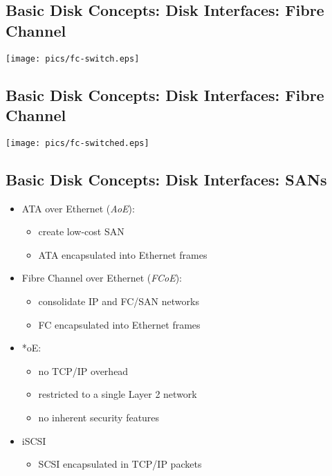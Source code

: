 \documentclass[xga]{xdvislides}
\begin{document}
\subsection{Basic Disk Concepts: Disk Interfaces: Fibre Channel}
\vfill
	\begin{center}
		\texttt{[image: pics/fc-switch.eps]} \\
	\end{center}
\vfill

\subsection{Basic Disk Concepts: Disk Interfaces: Fibre Channel}
\vfill
	\begin{center}
		\texttt{[image: pics/fc-switched.eps]} \\
	\end{center}
\vfill

\subsection{Basic Disk Concepts: Disk Interfaces: SANs}
\begin{itemize}
	\item ATA over Ethernet ({\em AoE}):
		\begin{itemize}
			\item create low-cost SAN
			\item ATA encapsulated into Ethernet frames
		\end{itemize}
	\item Fibre Channel over Ethernet ({\em FCoE}):
		\begin{itemize}
			\item consolidate IP and FC/SAN networks
			\item FC encapsulated into Ethernet frames
		\end{itemize}

	\item *oE:
		\begin{itemize}
			\item no TCP/IP overhead
			\item restricted to a single Layer 2 network
			\item no inherent security features
		\end{itemize}
	\item iSCSI
		\begin{itemize}
			\item SCSI encapsulated in TCP/IP packets
		\end{itemize}
\end{itemize}
\end{document}
